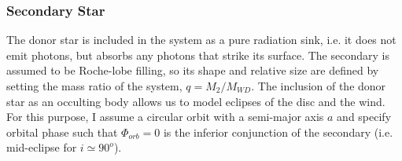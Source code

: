 \subsubsection{Secondary Star}

The donor star is included in the system as a pure radiation sink, 
i.e. it does not emit photons, but absorbs any photons that strike its
surface. The secondary is assumed to be Roche-lobe filling, so its
shape and relative size are defined by setting the mass ratio of the system, 
$q = M_2/M_{WD}$. The inclusion of the donor star as an occulting body
allows us to model eclipses of the disc and the wind. For this
purpose, I assume a circular orbit with a semi-major axis $a$ and 
specify orbital phase such that $\Phi_{orb} = 0$ is the
inferior conjunction of the secondary (i.e. mid-eclipse for $i \simeq
90^o$).




%
%


